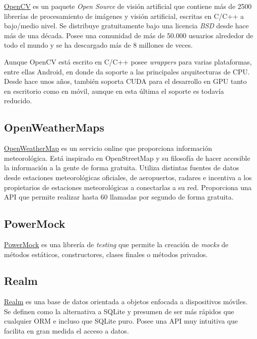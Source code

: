 \href{www.opencv.org}{OpenCV} es un paquete \emph{Open Source} de visión
artificial que contiene más de 2500 librerías de procesamiento de
imágenes y visión artificial, escritas en C/C++ a bajo/medio nivel. Se
distribuye gratuitamente bajo una licencia \emph{BSD} desde hace más de
una década. Posee una comunidad de más de 50.000 usuarios alrededor de
todo el mundo y se ha descargado más de 8 millones de veces.

Aunque OpenCV está escrito en C/C++ posee \emph{wrappers} para varias
plataformas, entre ellas Android, en donde da soporte a las principales
arquitecturas de CPU. Desde hace unos años, también soporta CUDA para el
desarrollo en GPU tanto en escritorio como en móvil, aunque en esta
última el soporte es todavía reducido.

\subsection{OpenWeatherMaps}\label{openweathermaps}

\href{http://openweathermap.org/}{OpenWeatherMap} es un servicio online
que proporciona información meteorológica. Está inspirado en
OpenStreetMap y su filosofía de hacer accesible la información a la
gente de forma gratuita. Utiliza distintas fuentes de datos desde
estaciones meteorológicas oficiales, de aeropuertos, radares e incentiva
a los propietarios de estaciones meteorológicas a conectarlas a su red.
Proporciona una API que permite realizar hasta 60 llamadas por segundo
de forma gratuita.

\subsection{PowerMock}\label{powermock}

\href{https://github.com/powermock/powermock}{PowerMock} es una librería
de \emph{testing} que permite la creación de \emph{mocks} de métodos
estáticos, constructores, clases finales o métodos privados.

\subsection{Realm}\label{realm}

\href{https://realm.io/products/realm-mobile-database/}{Realm} es una
base de datos orientada a objetos enfocada a dispositivos móviles. Se
definen como la alternativa a SQLite y presumen de ser más rápidos que
cualquier ORM e incluso que SQLite puro. Posee una API muy intuitiva que
facilita en gran medida el acceso a datos.


